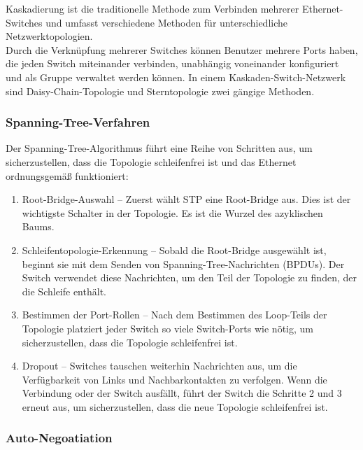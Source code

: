         Kaskadierung ist die traditionelle Methode zum Verbinden mehrerer Ethernet-Switches 
        und umfasst verschiedene Methoden für unterschiedliche Netzwerktopologien.\\
        Durch die Verknüpfung mehrerer Switches können Benutzer mehrere Ports haben, 
        die jeden Switch miteinander verbinden, unabhängig voneinander konfiguriert 
        und als Gruppe verwaltet werden können. 
        In einem Kaskaden-Switch-Netzwerk sind Daisy-Chain-Topologie und 
        Sterntopologie zwei gängige Methoden. 

        \subsubsection{Spanning-Tree-Verfahren}

        Der Spanning-Tree-Algorithmus führt eine Reihe von Schritten aus, 
        um sicherzustellen, dass die Topologie schleifenfrei ist und das Ethernet ordnungsgemäß funktioniert:\\
        \begin{enumerate}
            \item Root-Bridge-Auswahl – Zuerst wählt STP eine Root-Bridge aus. Dies ist der wichtigste Schalter in der Topologie. Es ist die Wurzel des azyklischen Baums.
            \item Schleifentopologie-Erkennung – Sobald die Root-Bridge ausgewählt ist, beginnt sie mit dem Senden von Spanning-Tree-Nachrichten (BPDUs). Der Switch verwendet diese Nachrichten, um den Teil der Topologie zu finden, der die Schleife enthält.
            \item Bestimmen der Port-Rollen – Nach dem Bestimmen des Loop-Teils der Topologie platziert jeder Switch so viele Switch-Ports wie nötig, um sicherzustellen, dass die Topologie schleifenfrei ist.
            \item Dropout – Switches tauschen weiterhin Nachrichten aus, um die Verfügbarkeit von Links und Nachbarkontakten zu verfolgen. Wenn die Verbindung oder der Switch ausfällt, führt der Switch die Schritte 2 und 3 erneut aus, um sicherzustellen, dass die neue Topologie schleifenfrei ist.
        \end{enumerate}

        \subsubsection{Auto-Negoatiation}

